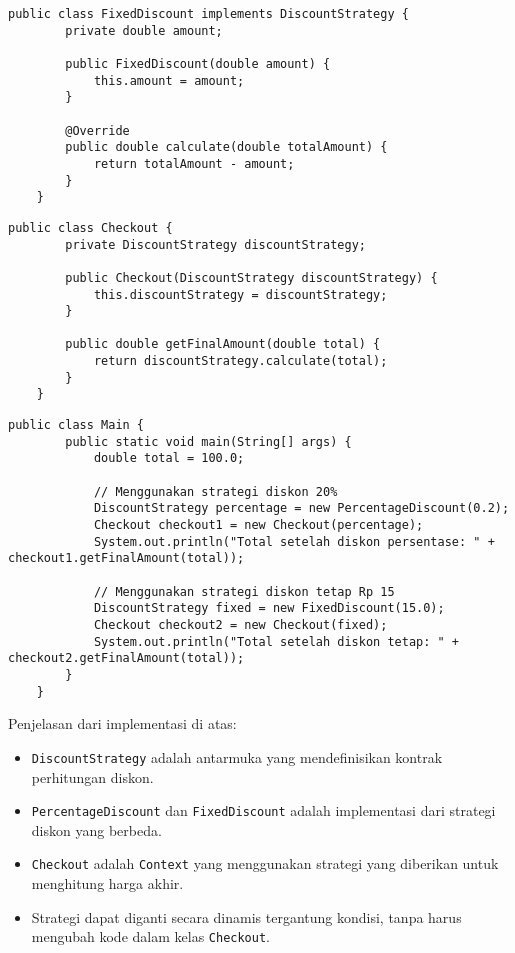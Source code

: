\begin{lstlisting}[style=JavaStyle, caption={Strategi Diskon Tetap}, label={lst:strategy-fixed}]
	public class FixedDiscount implements DiscountStrategy {
		private double amount;
		
		public FixedDiscount(double amount) {
			this.amount = amount;
		}
		
		@Override
		public double calculate(double totalAmount) {
			return totalAmount - amount;
		}
	}
\end{lstlisting}

\begin{lstlisting}[style=JavaStyle, caption={Context: Kasir atau Checkout}, label={lst:strategy-context}]
	public class Checkout {
		private DiscountStrategy discountStrategy;
		
		public Checkout(DiscountStrategy discountStrategy) {
			this.discountStrategy = discountStrategy;
		}
		
		public double getFinalAmount(double total) {
			return discountStrategy.calculate(total);
		}
	}
\end{lstlisting}

\begin{lstlisting}[style=JavaStyle, caption={Client: Menggunakan Strategi Diskon}, label={lst:strategy-client}]
	public class Main {
		public static void main(String[] args) {
			double total = 100.0;
			
			// Menggunakan strategi diskon 20%
			DiscountStrategy percentage = new PercentageDiscount(0.2);
			Checkout checkout1 = new Checkout(percentage);
			System.out.println("Total setelah diskon persentase: " + checkout1.getFinalAmount(total));
			
			// Menggunakan strategi diskon tetap Rp 15
			DiscountStrategy fixed = new FixedDiscount(15.0);
			Checkout checkout2 = new Checkout(fixed);
			System.out.println("Total setelah diskon tetap: " + checkout2.getFinalAmount(total));
		}
	}
\end{lstlisting}

Penjelasan dari implementasi di atas:
\begin{itemize}
	\item \texttt{DiscountStrategy} adalah antarmuka yang mendefinisikan kontrak perhitungan diskon.
	\item \texttt{PercentageDiscount} dan \texttt{FixedDiscount} adalah implementasi dari strategi diskon yang berbeda.
	\item \texttt{Checkout} adalah \texttt{Context} yang menggunakan strategi yang diberikan untuk menghitung harga akhir.
	\item Strategi dapat diganti secara dinamis tergantung kondisi, tanpa harus mengubah kode dalam kelas \texttt{Checkout}.
\end{itemize}

